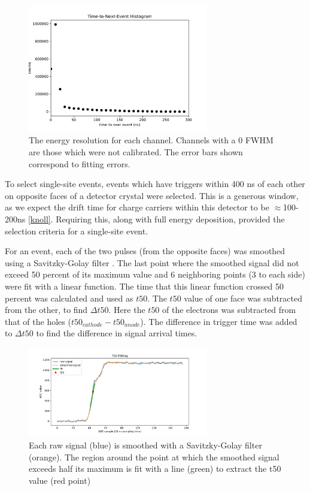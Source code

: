 \begin{figure}[h]
\begin{centering}
\includegraphics[width=0.7\textwidth]{./figures/time-to-next-event.pdf}
\caption{The energy resolution for each channel. Channels with a 0 FWHM are those which were not calibrated. The error bars shown correspond to fitting errors.}
\label{timehist}
\end{centering}
\end{figure}

To select single-site events, events which have triggers within 400 ns of each other on opposite faces of a detector crystal were selected. This is a generous window, as we expect the drift time for charge carriers within this detector to be $\approx$100-200ns \ref{knoll}. Requiring this, along with full energy deposition, provided the selection criteria for a single-site event.

For an event, each of the two pulses (from the opposite faces) was smoothed using a Savitzky-Golay filter \cite{scipy}. The last point where the smoothed signal did not exceed 50 percent of its maximum value and 6 neighboring points (3 to each side) were fit with a linear function. The time that this linear function crossed 50 percent was calculated and used as $t50$. The $t50$ value of one face was subtracted from the other, to find $\Delta t50$. Here the $t50$ of the electrons was subtracted from that of the holes ($t50_{cathode}- t50_{anode}$). The difference in trigger time was added to $\Delta t50$ to find the difference in signal arrival times.

\begin{figure}[h]
\begin{centering}
\includegraphics[width=0.7\textwidth]{./figures/t50_fitting.pdf}
\caption{Each raw signal (blue) is smoothed with a Savitzky-Golay filter (orange). The region around the point at which the smoothed signal exceeds half its maximum is fit with a line (green) to extract the t50 value (red point)}
\label{fit}
\end{centering}
\end{figure}

